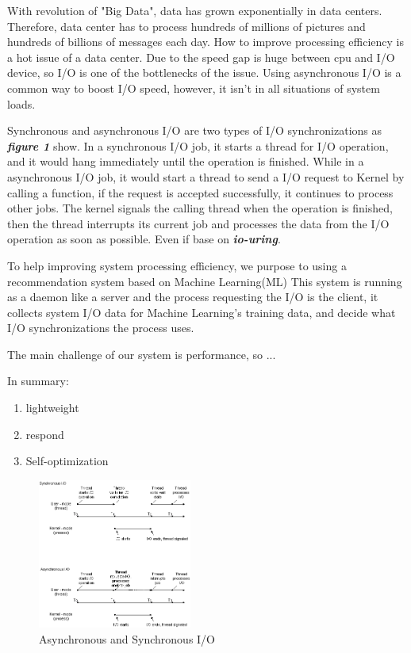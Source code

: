 \documentclass[conference]{IEEEtran}
\begin{document}
With revolution of "Big Data", data has grown exponentially in data centers. Therefore, data center has to process hundreds of millions of pictures and hundreds of billions of messages each day.
How to improve processing efficiency is a hot issue of a data center. Due to the speed gap is huge between cpu and I/O device, so I/O is one of the bottlenecks of the issue.
Using asynchronous I/O is a common way to boost I/O speed, however, it isn't in all situations of system loads. 

Synchronous and asynchronous I/O are two types of I/O synchronizations as  \emph{\textbf{\large{figure 1}}} show. In a synchronous I/O job, it starts a thread for I/O operation, and it would hang immediately until the operation is finished.
While in a asynchronous I/O job, it would start a thread to send a I/O request to Kernel by calling a function, if the request is accepted successfully, it continues to process other jobs. 
The kernel signals the calling thread when the operation is finished, then the thread interrupts its current job and processes the data from the I/O operation as soon as possible.
Even if base on \emph{\textbf{io-uring}}.

To help improving system processing efficiency, we purpose to using a recommendation system based on Machine Learning(ML)
This system is running as a daemon like a server and the process requesting the I/O is the client, it collects system I/O data for Machine Learning's training data,
and decide what I/O synchronizations the process uses.

The main challenge of our system is performance, so ...

In summary:
\begin{enumerate}
    \item lightweight
    \item respond 
    \item Self-optimization
\end{enumerate}


\begin{figure}[htbp]
        \centering
        \includegraphics[width=0.45\textwidth]{fig2bedit.png}
        \caption{Asynchronous and Synchronous I/O}
\end{figure}
\end{document}
